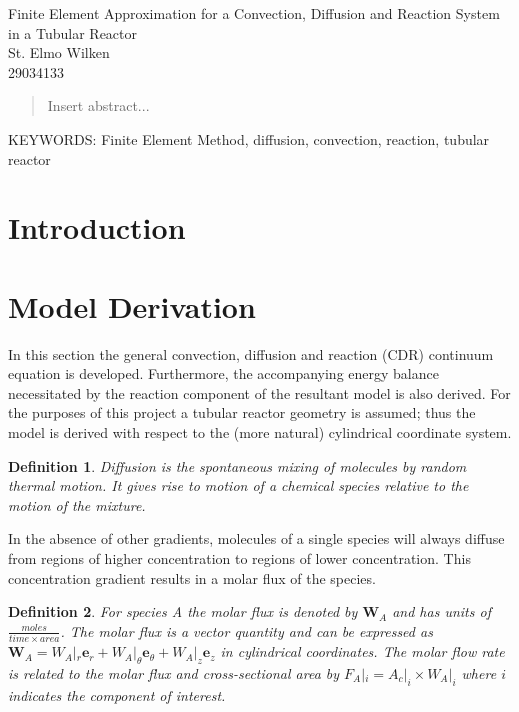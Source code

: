 \documentclass[11pt,fleqn]{article}
\theoremstyle{defstyle}
\newtheorem{defn}{Definition}[section]
\begin{document}


\begin{center}
\Large Finite Element Approximation for a Convection, Diffusion and Reaction System in a Tubular Reactor \\[0.5cm]
\large St. Elmo Wilken \\
29034133
\end{center}

\begin{abstract}
Insert abstract...
\end{abstract}

\textsc{\small KEYWORDS:} \small Finite Element Method, diffusion, convection, reaction, tubular reactor
\tableofcontents
{}

\newpage
{}
\section{Introduction}

\section{Model Derivation}
In this section the general convection, diffusion and reaction (CDR) continuum equation is developed. Furthermore, the accompanying energy balance necessitated by the reaction component of the resultant model is also derived. For the purposes of this project a tubular reactor geometry is assumed; thus the model is derived with respect to the (more natural) cylindrical coordinate system. 

\begin{defn}
Diffusion is the spontaneous mixing of molecules by random thermal motion. It gives rise to motion of a chemical species relative to the motion of the mixture.
\end{defn}

In the absence of other gradients, molecules of a single species will always diffuse from regions of higher concentration to regions of lower concentration. This concentration gradient results in a molar flux of the species.

\begin{defn}
For species A the molar flux is denoted by $\mathbf{W}_A$ and has units of $\frac{moles}{time \times area}$. The molar flux is a vector quantity and can be expressed as $\mathbf{W}_A = W_A|_r \mathbf{e}_r + W_A|_\theta \mathbf{e}_\theta + W_A|_z \mathbf{e}_z$ in cylindrical coordinates. The molar flow rate is related to the molar flux and cross-sectional area by $F_A|_i = A_c|_i \times W_A|_i$ where $i$ indicates the component of interest. 
\end{defn}
\end{document}
